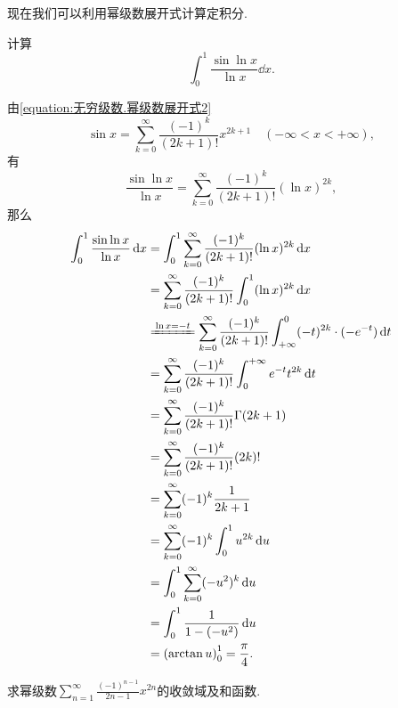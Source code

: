 现在我们可以利用幂级数展开式计算定积分.
\begin{example}
计算\[
	\int_0^1 \frac{\sin\ln x}{\ln x} \dd{x}.
\]
\begin{solution}
由\cref{equation:无穷级数.幂级数展开式2} \[
	\sin x = \sum_{k=0}^\infty \frac{(-1)^k}{(2k+1)!} x^{2k+1}
	\quad(-\infty<x<+\infty),
\]
有\[
	\frac{\sin\ln x}{\ln x} = \sum_{k=0}^\infty \frac{(-1)^k}{(2k+1)!} (\ln x)^{2k},
\]
那么\begin{align*}
	\int_0^1 \frac{\sin\ln x}{\ln x} \dd{x}
	&= \int_0^1 \sum_{k=0}^\infty \frac{(-1)^k}{(2k+1)!} (\ln x)^{2k} \dd{x} \\
	&= \sum_{k=0}^\infty \frac{(-1)^k}{(2k+1)!} \int_0^1 (\ln x)^{2k} \dd{x} \\
	&\xlongequal{\ln x = -t}
		\sum_{k=0}^\infty \frac{(-1)^k}{(2k+1)!}
		\int_{+\infty}^0 (-t)^{2k} \cdot (-e^{-t}) \dd{t} \\
	&= \sum_{k=0}^\infty \frac{(-1)^k}{(2k+1)!}
		\int^{+\infty}_0 e^{-t} t^{2k} \dd{t} \\
	&= \sum_{k=0}^\infty \frac{(-1)^k}{(2k+1)!} \Gamma(2k+1) \\
	&= \sum_{k=0}^\infty \frac{(-1)^k}{(2k+1)!} (2k)! \\
	&= \sum_{k=0}^\infty (-1)^k \frac{1}{2k+1} \\
	&= \sum_{k=0}^\infty (-1)^k \int_0^1 u^{2k} \dd{u} \\
	&= \int_0^1 \sum_{k=0}^\infty (-u^2)^k \dd{u} \\
	&= \int_0^1 \frac{1}{1-(-u^2)} \dd{u} \\
	&= \left(\arctan u\right)_0^1
	= \frac{\pi}{4}.
\end{align*}
\end{solution}
\end{example}

\begin{example}
求幂级数\(\sum_{n=1}^\infty \frac{(-1)^{n-1}}{2n-1} x^{2n}\)的收敛域及和函数.
\end{example}
